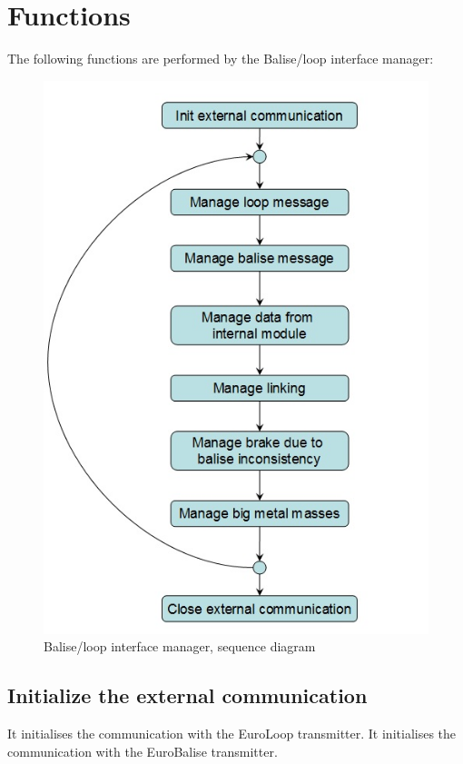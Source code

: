 \documentclass[nocc]{template/openetcs_report}
\begin{document}
\section{Functions}
The following functions are performed by the Balise/loop interface manager:
\begin{figure}[!h]
  \centering
  \includegraphics[width=\textwidth]{image/evc_balise_loop_interface_manager}
  \caption{Balise/loop interface manager, sequence diagram}
  \label{fig:Balise/loop interface manager, sequence diagram}
\end{figure}
\subsection{Initialize the external communication}
It initialises the communication with the EuroLoop transmitter.
It initialises the communication with the EuroBalise transmitter.
\end{document}
